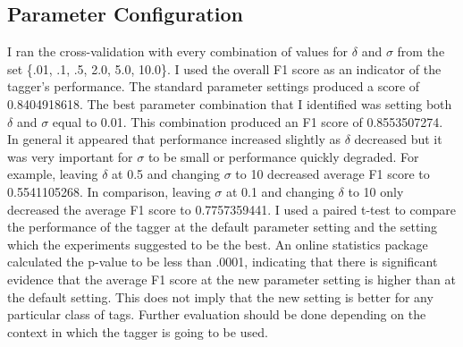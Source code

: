 \documentclass[paper=a4, fontsize=11pt]{jhwhw} %
\begin{document}
\subsection{Parameter Configuration}
I ran the cross-validation with every combination of values for $\delta$ and $\sigma$ from the set \{.01, .1, .5, 2.0, 5.0, 10.0\}. I used the overall F1 score as an indicator of the tagger's performance. The standard parameter settings produced a score of 0.8404918618. The best parameter 
combination that I identified was setting both $\delta$ and $\sigma$ equal to 0.01. This
combination produced an F1 score of 0.8553507274. In general it appeared that performance increased slightly as $\delta$ decreased but it was very important for $\sigma$ to be small or performance
quickly degraded. For example, leaving $\delta$ at 0.5 and changing $\sigma$ to 10 decreased average
F1 score to 0.5541105268. In comparison, leaving $\sigma$ at 0.1 and changing $\delta$ to 10 only 
decreased the average F1 score to 0.7757359441. I used a paired t-test to compare the performance of the tagger at the default parameter setting and the setting which the experiments suggested to be the best. An online statistics package calculated the p-value to be less than .0001, indicating that there is significant evidence that the average F1 score at the new parameter setting is higher than 
at the default setting. This does not imply that the new setting is better for any particular class of tags. Further evaluation should be done depending on the context in which the tagger is going to 
be used. 
\end{document}

